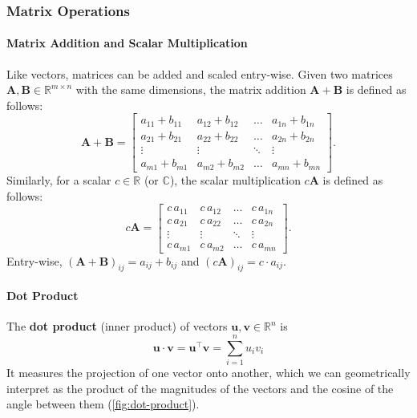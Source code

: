 \subsubsection{Matrix Operations}

\paragraph*{Matrix Addition and Scalar Multiplication}
Like vectors, matrices can be added and scaled entry-wise.
Given two matrices $ \mathbf{A}, \mathbf{B} \in \mathbb{R}^{m \times n} $ with the same dimensions, the matrix addition $ \mathbf{A} + \mathbf{B} $ is defined as follows:
\begin{equation*}
    \mathbf{A} + \mathbf{B} =
    \begin{bmatrix}
        a_{11} + b_{11} & a_{12} + b_{12} & \ldots & a_{1n} + b_{1n} \\
        a_{21} + b_{21} & a_{22} + b_{22} & \ldots & a_{2n} + b_{2n} \\
        \vdots & \vdots & \ddots & \vdots \\
        a_{m1} + b_{m1} & a_{m2} + b_{m2} & \ldots & a_{mn} + b_{mn}
    \end{bmatrix}.
\end{equation*}
Similarly, for a scalar $ c \in \mathbb{R} $ (or $ \mathbb{C} $), the scalar multiplication $ c\mathbf{A} $ is defined as follows:
\begin{equation*}
    c\mathbf{A} =
    \begin{bmatrix}
        c\, a_{11} & c\, a_{12} & \ldots & c\, a_{1n} \\
        c\, a_{21} & c\, a_{22} & \ldots & c\, a_{2n} \\
        \vdots & \vdots & \ddots & \vdots \\
        c\, a_{m1} & c\, a_{m2} & \ldots & c\, a_{mn}
    \end{bmatrix}.
\end{equation*}
Entry-wise, $ (\mathbf{A} + \mathbf{B})_{ij} = a_{ij} + b_{ij} $ and $ (c\mathbf{A})_{ij} = c \cdot a_{ij} $.

\paragraph*{Dot Product}
The \textbf{dot product} (inner product) of vectors $ \mathbf{u}, \mathbf{v} \in \mathbb{R}^n $ is
\begin{equation*}
    \mathbf{u}\cdot\mathbf{v} = \mathbf{u}^\top \mathbf{v} = \sum_{i=1}^n u_i v_i
\end{equation*}
It measures the projection of one vector onto another, which we can geometrically interpret as the product of the magnitudes of the vectors and the cosine of the angle between them (\autoref{fig:dot-product}). 

